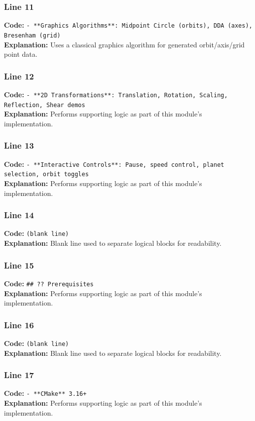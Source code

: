 \documentclass[11pt,a4paper]{article}
\begin{document}
\subsubsection*{Line 11}
\textbf{Code:} \verb|- **Graphics Algorithms**: Midpoint Circle (orbits), DDA (axes), Bresenham (grid)|\\
\textbf{Explanation:} Uses a classical graphics algorithm for generated orbit/axis/grid point data.

\subsubsection*{Line 12}
\textbf{Code:} \verb|- **2D Transformations**: Translation, Rotation, Scaling, Reflection, Shear demos|\\
\textbf{Explanation:} Performs supporting logic as part of this module's implementation.

\subsubsection*{Line 13}
\textbf{Code:} \verb|- **Interactive Controls**: Pause, speed control, planet selection, orbit toggles|\\
\textbf{Explanation:} Performs supporting logic as part of this module's implementation.

\subsubsection*{Line 14}
\textbf{Code:} \texttt{(blank line)}\\
\textbf{Explanation:} Blank line used to separate logical blocks for readability.

\subsubsection*{Line 15}
\textbf{Code:} \verb|## ?? Prerequisites|\\
\textbf{Explanation:} Performs supporting logic as part of this module's implementation.

\subsubsection*{Line 16}
\textbf{Code:} \texttt{(blank line)}\\
\textbf{Explanation:} Blank line used to separate logical blocks for readability.

\subsubsection*{Line 17}
\textbf{Code:} \verb|- **CMake** 3.16+|\\
\textbf{Explanation:} Performs supporting logic as part of this module's implementation.
\end{document}

